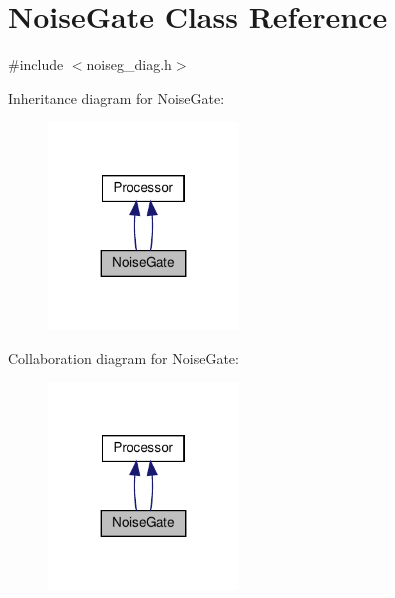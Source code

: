 \hypertarget{classNoiseGate}{}\section{Noise\+Gate Class Reference}
\label{classNoiseGate}


{\ttfamily \#include $<$noiseg\+\_\+diag.\+h$>$}



Inheritance diagram for Noise\+Gate\+:\nopagebreak
\begin{figure}[H]
\begin{center}
\leavevmode
\includegraphics[width=143pt]{classNoiseGate__inherit__graph}
\end{center}
\end{figure}


Collaboration diagram for Noise\+Gate\+:\nopagebreak
\begin{figure}[H]
\begin{center}
\leavevmode
\includegraphics[width=143pt]{classNoiseGate__coll__graph}
\end{center}
\end{figure}
